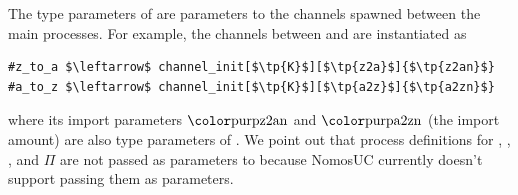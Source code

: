 
The type parameters of  are parameters to the channels spawned between the main processes.
For example, the channels between \Z and \A are instantiated as
\begin{lstlisting}[basicstyle=\footnotesize\BeraMonottFamily, mathescape]
#z_to_a $\leftarrow$ channel_init[$\tp{K}$][$\tp{z2a}$]{$\tp{z2an}$}
#a_to_z $\leftarrow$ channel_init[$\tp{K}$][$\tp{a2z}$]{$\tp{a2zn}$}
\end{lstlisting}
where its import parameters $\tp{z2an}$ and $\tp{a2zn}$ (the import amount) are also type parameters of .
We point out that process definitions for \Z, \A, \F, and $\Pi$ are not passed as parameters to  because NomosUC currently doesn't support passing them as parameters.

